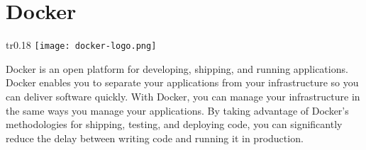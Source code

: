     
    \section{Docker}
    \begin{wrapfigure}[4]{tr}{0.18\textwidth} %
        \vspace{-1cm}
        \hspace{3cm}
        \texttt{[image: docker-logo.png]}
    \end{wrapfigure}
    Docker is an open platform for developing, shipping, and running 
    applications. Docker enables you to separate your applications 
    from your infrastructure so you can deliver software quickly. 
    With Docker, you can manage your infrastructure in the same ways 
    you manage your applications. By taking advantage of Docker's 
    methodologies for shipping, testing, and deploying code, you can 
    significantly reduce the delay between writing code and running 
    it in production. \cite{what_is_docker}

